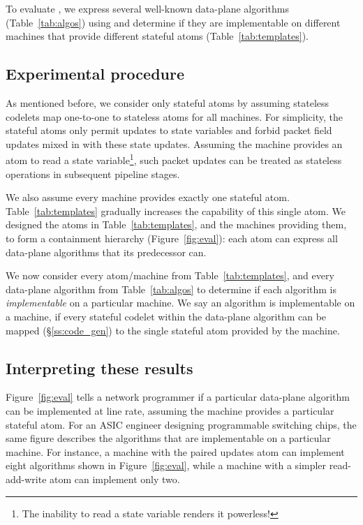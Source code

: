 To evaluate \pktlanguage, we express several well-known data-plane algorithms
(Table~\ref{tab:algos}) using \pktlanguage and determine if they are
implementable on different \absmachine machines that provide different stateful
atoms (Table~\ref{tab:templates}).

\subsection{Experimental procedure}
As mentioned before, we consider only stateful atoms by assuming stateless
codelets map one-to-one to stateless atoms for all \absmachine machines. For
simplicity, the stateful atoms only permit updates to state variables and
forbid packet field updates mixed in with these state updates.  Assuming the
\absmachine machine provides an atom to read a state variable\footnote{The
inability to read a state variable renders it powerless!}, such packet updates
can be treated as stateless operations in subsequent pipeline stages.

We also assume every \absmachine machine provides exactly one stateful atom.
Table~\ref{tab:templates} gradually increases the capability of this single
atom.  We designed the atoms in Table~\ref{tab:templates}, and the \absmachine
machines providing them, to form a containment hierarchy
(Figure~\ref{fig:eval}): each atom can express all data-plane algorithms that
its predecessor can.

We now consider every atom/\absmachine machine from Table~\ref{tab:templates},
and every data-plane algorithm from Table~\ref{tab:algos} to determine if each
algorithm is \textit{implementable} on a particular \absmachine machine. We
say an algorithm is implementable on a \absmachine machine, if every stateful
codelet within the data-plane algorithm can be mapped (\S\ref{ss:code_gen}) to
the single stateful atom provided by the \absmachine machine.

\subsection{Interpreting these results}
Figure~\ref{fig:eval} tells a network programmer if a particular data-plane
algorithm can be implemented at line rate, assuming the \absmachine machine
provides a particular stateful atom. For an ASIC engineer designing
programmable switching chips, the same figure describes the algorithms that are
implementable on a particular \absmachine machine. For instance, a \absmachine
machine with the paired updates atom can implement eight algorithms shown in
Figure~\ref{fig:eval}, while a machine with a simpler read-add-write atom can
implement only two.

